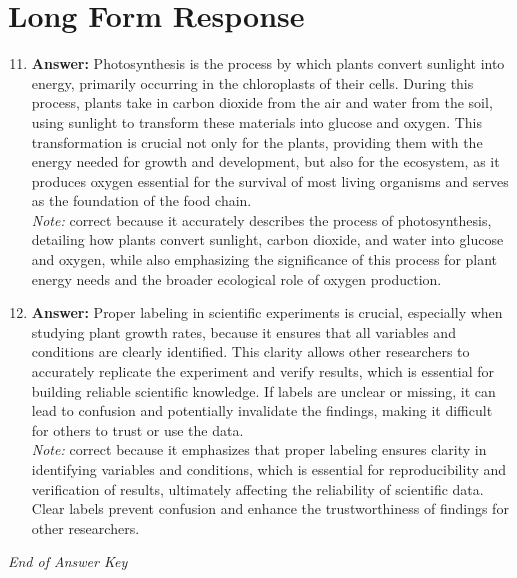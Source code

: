 \documentclass[12pt]{article}
\begin{document}
\section*{Long Form Response}
\begin{enumerate}[label=\arabic*.]
\setcounter{enumi}{10}
\item \textbf{Answer:} Photosynthesis is the process by which plants convert sunlight into energy, primarily occurring in the chloroplasts of their cells. During this process, plants take in carbon dioxide from the air and water from the soil, using sunlight to transform these materials into glucose and oxygen. This transformation is crucial not only for the plants, providing them with the energy needed for growth and development, but also for the ecosystem, as it produces oxygen essential for the survival of most living organisms and serves as the foundation of the food chain.
\\ \textit{Note:} correct because it accurately describes the process of photosynthesis, detailing how plants convert sunlight, carbon dioxide, and water into glucose and oxygen, while also emphasizing the significance of this process for plant energy needs and the broader ecological role of oxygen production.
\item \textbf{Answer:} Proper labeling in scientific experiments is crucial, especially when studying plant growth rates, because it ensures that all variables and conditions are clearly identified. This clarity allows other researchers to accurately replicate the experiment and verify results, which is essential for building reliable scientific knowledge. If labels are unclear or missing, it can lead to confusion and potentially invalidate the findings, making it difficult for others to trust or use the data.
\\ \textit{Note:} correct because it emphasizes that proper labeling ensures clarity in identifying variables and conditions, which is essential for reproducibility and verification of results, ultimately affecting the reliability of scientific data. Clear labels prevent confusion and enhance the trustworthiness of findings for other researchers.
\end{enumerate}

\vfill
\noindent\textit{End of Answer Key}
\end{document}
